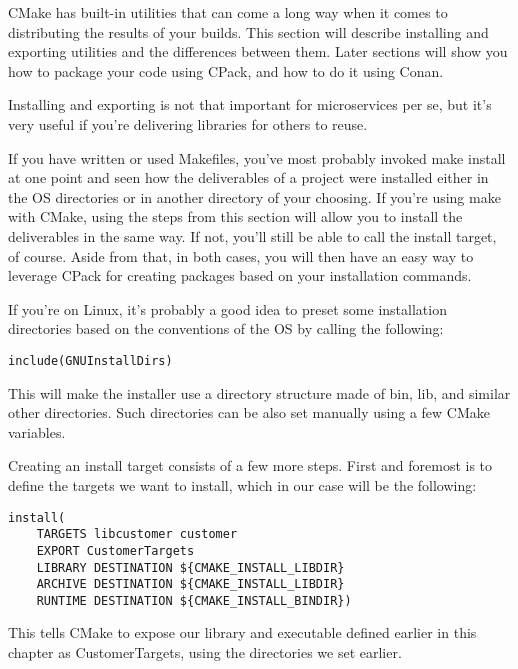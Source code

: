 
CMake has built-in utilities that can come a long way when it comes to distributing the results of your builds. This section will describe installing and exporting utilities and the differences between them. Later sections will show you how to package your code using CPack, and how to do it using Conan. 

Installing and exporting is not that important for microservices per se, but it's very useful if you're delivering libraries for others to reuse.


If you have written or used Makefiles, you've most probably invoked make install at one point and seen how the deliverables of a project were installed either in the OS directories or in another directory of your choosing. If you're using make with CMake, using the steps from this section will allow you to install the deliverables in the same way. If not, you'll still be able to call the install target, of course. Aside from that, in both cases, you will then have an easy way to leverage CPack for creating packages based on your installation commands.

If you're on Linux, it's probably a good idea to preset some installation directories based on the conventions of the OS by calling the following:

\begin{lstlisting}[style=styleCMake]
include(GNUInstallDirs)
\end{lstlisting}

This will make the installer use a directory structure made of bin, lib, and similar other directories. Such directories can be also set manually using a few CMake variables.

Creating an install target consists of a few more steps. First and foremost is to define the targets we want to install, which in our case will be the following:

\begin{lstlisting}[style=styleCMake]
install(
	TARGETS libcustomer customer
	EXPORT CustomerTargets
	LIBRARY DESTINATION ${CMAKE_INSTALL_LIBDIR}
	ARCHIVE DESTINATION ${CMAKE_INSTALL_LIBDIR}
	RUNTIME DESTINATION ${CMAKE_INSTALL_BINDIR})
\end{lstlisting}

This tells CMake to expose our library and executable defined earlier in this chapter as CustomerTargets, using the directories we set earlier.


